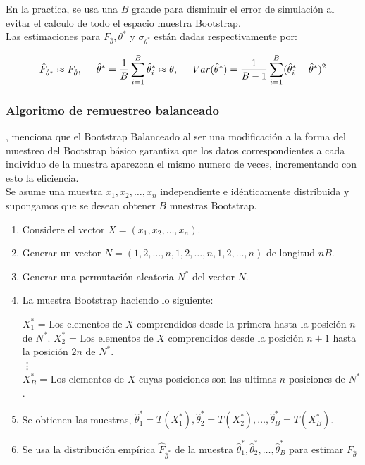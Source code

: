 En la practica, se usa una $B$ grande para disminuir el error de simulación al evitar el calculo de todo el espacio muestra Bootstrap.\\

Las estimaciones para  $F_{\hat{\theta}}, \theta^{*}$ y $ \sigma_{\theta^{*}} $ están dadas respectivamente por:

\[
\hat{F}_{\hat{\theta}^{*}} \approx F_{\hat{\theta}}, 
\hspace{.5cm} \hat{\theta}^{*} = \frac{1}{B} \sum_{i=1}^{B}  \hat{\theta}^{*}_{i} \approx \theta,
\hspace{.5cm} Var(\hat{\theta}^{*}) = \frac{1}{B-1} \sum_{i=1}^{B}(\hat{\theta}^{*}_{i}-\hat{\theta}^{*})^2
\]




\subsubsection{Algoritmo de remuestreo balanceado \parencite{balam-2012}}
\textcite{balam-2012}, menciona que el Bootstrap Balanceado al ser una modificación a la forma del muestreo del Bootstrap básico garantiza que los datos correspondientes a cada individuo de la muestra aparezcan el mismo numero de veces, incrementando con esto la eficiencia.\\

Se asume una muestra  $ x_{1}, x_{2},  \dots,  x_{n}$ independiente e idénticamente distribuida y supongamos que se desean obtener $B$ muestras Bootstrap.

\begin{enumerate}
	\item  Considere el vector $ X=(x_{1}, x_{2},  \dots,  x_{n}) $.
	
	\item  Generar un vector $ N= (1,2,\dots,n,1,2,\dots,n,1,2,\dots,n)$ de longitud $nB$.
	
	\item Generar una permutación aleatoria $N^{*}$ del vector $N$.
	
	\item La muestra Bootstrap haciendo lo siguiente:
	
	$X^{*}_{1}$ =  Los elementos de $X$ comprendidos desde la primera hasta la posición $n$ de $N^{*}$.\linebreak
	$X^{*}_{2}$ =  Los elementos de $X$ comprendidos desde la posición $n + 1$ hasta la posición $2n$ de $N^{*}$.\\
	\vdots\\
	$X^{*}_{B}$ =  Los elementos de $X$  cuyas posiciones son las ultimas $n$ posiciones de $N^{*}$.
	
	\item  Se obtienen las muestras, $\hat{\theta}^{*}_{1} =T (X^{*}_{1}), \hat{\theta}^{*}_{2} =T (X^{*}_{2}), \dots, \hat{\theta}^{*}_{B} =T (X^{*}_{B})$.
	
	\item  Se usa la distribución empírica $\hat{F}_{\hat{\theta}^{*}}$ de la muestra $\hat{\theta}^{*}_{1},\hat{\theta}^{*}_{2}, \dots, \hat{\theta}^{*}_{B}$ para estimar $F_{\hat{\theta}}$
	
\end{enumerate}



